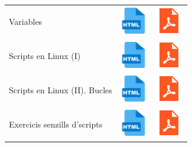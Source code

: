 \documentclass[
  12 pt,
  a4paper,
]{article}
\begin{document}
\begin{longtable}[]{@{}
  >{\raggedright\arraybackslash}p{}
  >{\raggedright\arraybackslash}p{}
  >{\raggedright\arraybackslash}p{}@{}}
\toprule\noalign{}
\endhead
\bottomrule\noalign{}
\endlastfoot
Variables &
\href{U7-ADMINISTRACIO\%20d'UBUNTU/U7-Variables.html}{\includegraphics{recursos/iconohtml.png}}
&
\href{U7-ADMINISTRACIO\%20d'UBUNTU/U7-Variables.pdf}{\includegraphics{recursos/iconopdf.png}} \\
Scripts en Linux (I) &
\href{U7-ADMINISTRACIO\%20d'UBUNTU/U7-Scripts.html}{\includegraphics{recursos/iconohtml.png}}
&
\href{U7-ADMINISTRACIO\%20d'UBUNTU/U7-Scripts.pdf}{\includegraphics{recursos/iconopdf.png}} \\
Scripts en Linux (II). Bucles &
\href{U7-ADMINISTRACIO\%20d'UBUNTU/U7-Scripts2.html}{\includegraphics{recursos/iconohtml.png}}
&
\href{U7-ADMINISTRACIO\%20d'UBUNTU/U7-Scripts2.pdf}{\includegraphics{recursos/iconopdf.png}} \\
Exercicis senzills d'scripts &
\href{U7-ADMINISTRACIO\%20d'UBUNTU/U7-Exercicis.html}{\includegraphics{recursos/iconohtml.png}}
&
\href{U7-ADMINISTRACIO\%20d'UBUNTU/U7-Exercicis.pdf}{\includegraphics{recursos/iconopdf.png}} \\

\end{longtable}
\end{document}
